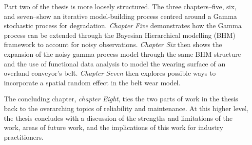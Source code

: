 Part two of the thesis is more loosely structured. The three chapters--five, six, and seven--show an iterative model-building process centred around a Gamma stochastic process for degradation. \textit{Chapter Five} demonstrates how the Gamma process can be extended through the Bayesian Hierarchical modelling (BHM) framework to account for noisy observations. \textit{Chapter Six} then shows the expansion of the noisy gamma process model through the same BHM structure and the use of functional data analysis to model the wearing surface of an overland conveyor's belt. \textit{Chapter Seven} then explores possible ways to incorporate a spatial random effect in the belt wear model.

The concluding chapter, \textit{chapter Eight}, ties the two parts of work in the thesis back to the overarching topics of reliability and maintenance. At this higher level, the thesis concludes with a discussion of the strengths and limitations of the work, areas of future work, and the implications of this work for industry practitioners.
